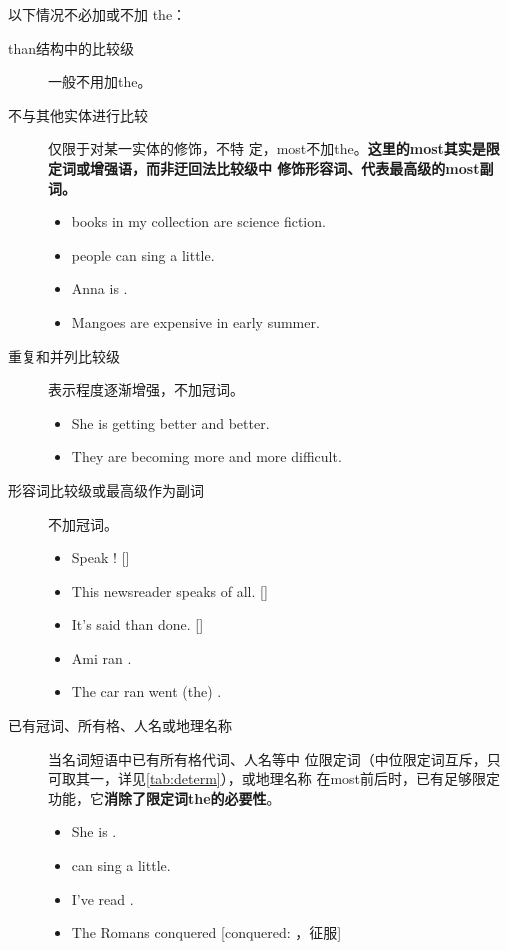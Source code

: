 以下情况不必加或不加 the：
\begin{description}
\item[than结构中的比较级] 一般不用加the。

\item[不与其他实体进行比较] 仅限于对某一实体的修饰，不特
  定，most不加the。\textbf{这里的most其实是限定词或增强语，而非迂回法比较级中
    修饰形容词、代表最高级的most副词。}
  \begin{itemize}
  \item {} books in my collection are science fiction.

  \item {} people can sing a little.

  \item Anna is .

  \item Mangoes are  expensive in early summer.

  \end{itemize}

\item[重复和并列比较级] 表示程度逐渐增强，不加冠词。
  \begin{itemize}
  \item She is getting better and better.

  \item They are becoming more and more difficult.
  \end{itemize}

\item[形容词比较级或最高级作为副词] 不加冠词。
  \begin{itemize}
  \item Speak ! []
  \item This newsreader speaks  of all. []
  \item It's  said than done. []
  \item Ami ran .
  \item The car ran went (the) .
  \end{itemize}

\item[已有冠词、所有格、人名或地理名称] 当名词短语中已有所有格代词、人名等中
  位限定词（中位限定词互斥，只可取其一，详见\cref{tab:determ}），或地理名称
  在most前后时，已有足够限定功能，它\textbf{消除了限定词the的必要性}。
  \begin{itemize}
  \item She is .

  \item {} can sing a little.

  \item I've read .

  \item The Romans conquered  [conquered:
    ，征服]
  \end{itemize}
\end{description}

